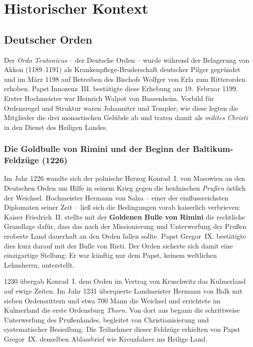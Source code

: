 \section{Historischer Kontext}

\subsection{Deutscher Orden}\label{deutscher_orden}

Der \textit{Ordo Teutonicus} -- der Deutsche Orden -- wurde während der Belagerung von Akkon (1189--1191) als Krankenpflege-Bruderschaft deutscher Pilger gegründet und im März 1198 auf Betreiben des Bischofs Wolfger von Erla zum Ritterorden erhoben. Papst Innozenz~III. bestätigte diese Erhebung am 19.~Februar 1199. Erster Hochmeister war Heinrich Walpot von Bassenheim. Vorbild für Ordensregel und Struktur waren Johanniter und Templer; wie diese legten die Mitglieder die drei monastischen Gelübde ab und traten damit als \textit{milites Christi} in den Dienst des Heiligen Landes. \cite{militzer_deutscher_orden,boockmann_deutscher_orden}

\subsubsection{Die Goldbulle von Rimini und der Beginn der Baltikum-Feldzüge (1226)}\label{goldbulle_von_rimini}

Im Jahr 1226 wandte sich der polnische Herzog Konrad~I. von Masowien an den Deutschen Orden um Hilfe in seinem Krieg gegen die heidnischen \textit{Prußen} östlich der Weichsel. Hochmeister Hermann von Salza -- einer der einflussreichsten Diplomaten seiner Zeit -- ließ sich die Bedingungen vorab kaiserlich verbrieven: Kaiser Friedrich~II. stellte mit der \textbf{Goldenen Bulle von Rimini} die rechtliche Grundlage dafür, dass das nach der Missionierung und Unterwerfung der Prußen eroberte Land dauerhaft an den Orden fallen sollte. Papst Gregor~IX. bestätigte dies kurz darauf mit der Bulle von Rieti. Der Orden sicherte sich damit eine einzigartige Stellung: Er war künftig nur dem Papst, keinem weltlichen Lehnsherrn, unterstellt. \cite{militzer_deutscher_orden,boockmann_deutscher_orden}

1230 übergab Konrad~I. dem Orden im Vertrag von Kruschwitz das Kulmerland auf ewige Zeiten. Im Jahr 1231 überquerte Landmeister Hermann von Balk mit sieben Ordensrittern und etwa 700 Mann die Weichsel und errichtete im Kulmerland die erste Ordensburg \textit{Thorn}. Von dort aus begann die schrittweise Unterwerfung des Prußenlandes, begleitet von Christianisierung und systematischer Besiedlung. Die Teilnehmer dieser Feldzüge erhielten von Papst Gregor~IX. denselben Ablassbrief wie Kreuzfahrer ins Heilige Land. \cite{militzer_deutscher_orden}

